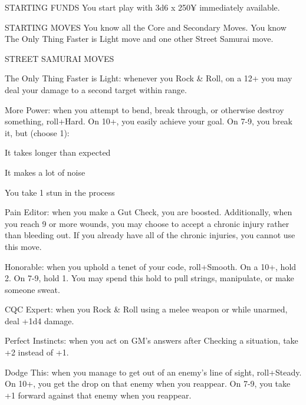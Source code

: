 STARTING FUNDS
You start play with 3d6 x 250¥ immediately available.

STARTING MOVES
You know all the Core and Secondary Moves. You know The Only Thing Faster is Light move and one other Street Samurai move.

STREET SAMURAI MOVES

The Only Thing Faster is Light: whenever you Rock \& Roll, on a 12+ you may deal your damage to a second target within range.

More Power: when you attempt to bend, break through, or otherwise destroy something, roll+Hard. On 10+, you easily achieve your goal. On 7-9, you break it, but (choose 1):

It takes longer than expected

It makes a lot of noise

You take 1 stun in the process

Pain Editor: when you make a Gut Check, you are boosted. Additionally, when you reach 9 or more wounds, you may choose to accept a chronic injury rather than bleeding out. If you already have all of the chronic injuries, you cannot use this move.

Honorable: when you uphold a tenet of your code, roll+Smooth. On a 10+, hold 2. On 7-9, hold 1. You may spend this hold to pull strings, manipulate, or make someone sweat.

CQC Expert: when you Rock \& Roll using a melee weapon or while unarmed, deal +1d4 damage.

Perfect Instincts: when you act on GM’s answers after Checking a situation, take +2 instead of +1.

Dodge This: when you manage to get out of an enemy’s line of sight, roll+Steady. On 10+, you get the drop on that enemy when you reappear. On 7-9, you take +1 forward against that enemy when you reappear.

